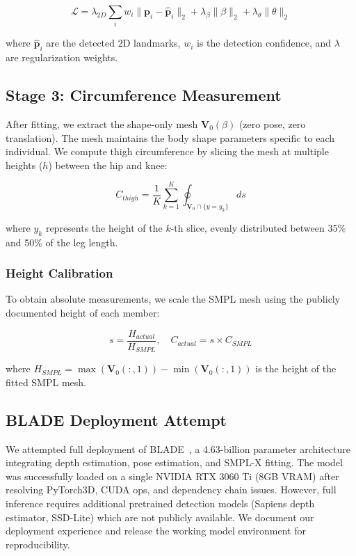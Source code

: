 \documentclass[11pt,a4paper]{article}
\begin{document}
\begin{equation}
\mathcal{L} = \lambda_{2D} \sum_i w_i \|\mathbf{p}_i - \hat{\mathbf{p}}_i\|_2 + \lambda_\beta \|\beta\|_2 + \lambda_\theta \|\theta\|_2
\end{equation}

where $\hat{\mathbf{p}}_i$ are the detected 2D landmarks, $w_i$ is the detection confidence, and $\lambda$ are regularization weights.

\subsection{Stage 3: Circumference Measurement}
After fitting, we extract the shape-only mesh $\mathbf{V}_0(\beta)$ (zero pose, zero translation). The mesh maintains the body shape parameters specific to each individual. We compute thigh circumference by slicing the mesh at multiple heights ($h$) between the hip and knee:

\begin{equation}
C_{thigh} = \frac{1}{K} \sum_{k=1}^{K} \oint_{\mathbf{V}_0 \cap \{y = y_k\}} ds
\end{equation}

where $y_k$ represents the height of the $k$-th slice, evenly distributed between 35\% and 50\% of the leg length.

\subsubsection{Height Calibration}
To obtain absolute measurements, we scale the SMPL mesh using the publicly documented height of each member:

\begin{equation}
s = \frac{H_{actual}}{H_{SMPL}}, \quad C_{actual} = s \times C_{SMPL}
\end{equation}

where $H_{SMPL} = \max(\mathbf{V}_0(:,1)) - \min(\mathbf{V}_0(:,1))$ is the height of the fitted SMPL mesh.

\subsection{BLADE Deployment Attempt}
We attempted full deployment of BLADE~\cite{blade}, a 4.63-billion parameter architecture integrating depth estimation, pose estimation, and SMPL-X fitting. The model was successfully loaded on a single NVIDIA RTX 3060 Ti (8GB VRAM) after resolving PyTorch3D, CUDA ops, and dependency chain issues. However, full inference requires additional pretrained detection models (Sapiens depth estimator, SSD-Lite) which are not publicly available. We document our deployment experience and release the working model environment for reproducibility.
\end{document}
